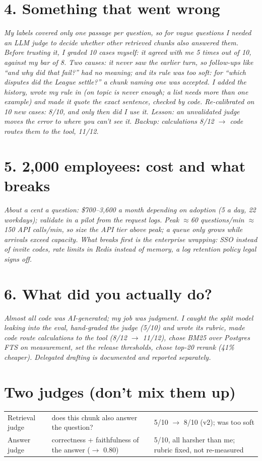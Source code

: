 \documentclass[10pt,a4paper]{article}
\newcommand{\ans}[1]{\par\smallskip\begingroup\itshape #1\par\endgroup}
\begin{document}
\section{4. Something that went wrong}
\ans{My labels covered only one passage per question, so for vague questions I needed an LLM judge to decide whether
other retrieved chunks also answered them. Before trusting it, I graded 10 cases myself: it agreed with me 5 times out of
10, against my bar of 8. Two causes: it never saw the earlier turn, so follow-ups like ``and why did that fail?'' had no
meaning; and its rule was too soft: for ``which disputes did the League settle?'' a chunk naming one was accepted. I
added the history, wrote my rule in (on topic is never enough; a list needs more than one example) and made it quote the
exact sentence, checked by code. Re-calibrated on 10 new cases: 8/10, and only then did I use it. Lesson: an unvalidated
judge moves the error to where you can't see it. Backup: calculations 8/12 $\to$ code routes them to the tool, 11/12.}

\section{5. 2,000 employees: cost and what breaks}
\ans{About a cent a question: \$700--3,600 a month depending on adoption (5 a day, 22 workdays); validate in a pilot from the
request logs. Peak $\approx$60 questions/min $\approx$150 API calls/min, so size the API tier above peak; a queue only grows while
arrivals exceed capacity. What breaks first is the enterprise wrapping: SSO instead of invite codes, rate limits in Redis
instead of memory, a log retention policy legal signs off.}

\section{6. What did you actually do?}
\ans{Almost all code was AI-generated; my job was judgment. I caught the split model leaking into the eval, hand-graded
the judge (5/10) and wrote its rubric, made code route calculations to the tool (8/12 $\to$ 11/12), chose BM25 over
Postgres FTS on measurement, set the release thresholds, chose top-20 rerank (41\% cheaper). Delegated drafting is
documented and reported separately.}

\section{Two judges (don't mix them up)}
\small
\begin{tabularx}{\linewidth}{@{}lXl@{}}
\toprule
Retrieval judge & does this chunk also answer the question? & 5/10 $\to$ 8/10 (v2); was too soft \\
Answer judge & correctness + faithfulness of the answer ($\to$ 0.80) & 5/10, all harsher than me; rubric fixed, not re-measured \\
\bottomrule
\end{tabularx}
\normalsize
\end{document}
